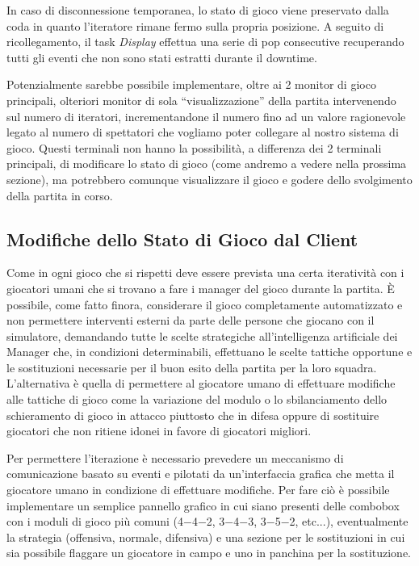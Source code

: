 \documentclass[aps,letterpaper,10pt]{article}
\begin{document}
In caso di disconnessione temporanea, lo stato di gioco viene preservato dalla coda in quanto l'iteratore rimane fermo sulla propria posizione. A seguito di ricollegamento, il task \emph{Display} effettua una serie di pop consecutive recuperando tutti gli eventi che non sono stati estratti durante il downtime. \vspace{3mm}

Potenzialmente sarebbe possibile implementare, oltre ai 2 monitor di gioco principali, olteriori monitor di sola ``visualizzazione'' della partita intervenendo sul numero di iteratori, incrementandone il numero fino ad un valore ragionevole legato al numero di spettatori che vogliamo poter collegare al nostro sistema di gioco. Questi terminali non hanno la possibilit\`a, a differenza dei 2 terminali principali, di modificare lo stato di gioco (come andremo a vedere nella prossima sezione), ma potrebbero comunque visualizzare il gioco e godere dello svolgimento della partita in corso.


\subsection{Modifiche dello Stato di Gioco dal Client} %
\label{sub:modifiche_dello_stato_di_gioco_dal_client}

Come in ogni gioco che si rispetti deve essere prevista una certa iterativit\`a con i giocatori umani che si trovano a fare i manager del gioco durante la partita. \`E possibile, come fatto finora, considerare il gioco completamente automatizzato e non permettere interventi esterni da parte delle persone che giocano con il simulatore, demandando tutte le scelte strategiche all'intelligenza artificiale dei Manager che, in condizioni determinabili, effettuano le scelte tattiche opportune e le sostituzioni necessarie per il buon esito della partita per la loro squadra. L'alternativa \`e quella di permettere al giocatore umano di effettuare modifiche alle tattiche di gioco come la variazione del modulo o lo sbilanciamento dello schieramento di gioco in attacco piuttosto che in difesa oppure di sostituire giocatori che non ritiene idonei in favore di giocatori migliori. \vspace{3mm}

Per permettere l'iterazione \`e necessario prevedere un meccanismo di comunicazione basato su eventi e pilotati da un'interfaccia grafica che metta il giocatore umano in condizione di effettuare modifiche. Per fare ci\`o \`e possibile implementare un semplice pannello grafico in cui siano presenti delle combobox con i moduli di gioco pi\`u comuni (4$-$4$-$2, 3$-$4$-$3, 3$-$5$-$2, etc...), eventualmente la strategia (offensiva, normale, difensiva) e una sezione per le sostituzioni in cui sia possibile flaggare un giocatore in campo e uno in panchina per la sostituzione. \vspace{3mm}
\end{document}
